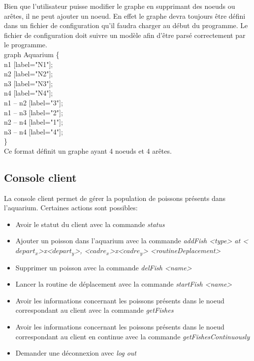 Bien que l'utilisateur puisse modifier le graphe en supprimant des noeuds ou arêtes, il ne peut ajouter un noeud. En effet le graphe devra toujours être défini dans un fichier de configuration qu'il faudra charger au début du programme.
Le fichier de configuration doit suivre un modèle afin d'être parsé correctement par le programme. \\

 \noindent graph Aquarium \{\\
    \indent n1 [label="N1"];\\
    \indent n2 [label="N2"];\\
    \indent n3 [label="N3"];\\
    \indent n4 [label="N4"];\\
    \indent n1 -- n2 [label="3"];\\
    \indent n1 -- n3 [label="2"];\\
    \indent n2 -- n4 [label="1"];\\
    \indent n3 -- n4 [label="4"];\\
\} \\
\label{the_label}
Ce format définit un graphe ayant 4 noeuds et 4 arêtes.

\subsection{Console client}
La console client permet de gérer la population de poissons présents dans l'aquarium. Certaines actions sont possibles:
\begin{itemize}
\item Avoir le statut du client avec la commande \textit{status}
\item Ajouter un poisson dans l'aquarium avec la commande \textit{addFish  <type> at <$depart_x$>x<$depart_y$>, <$cadre_x$>x<$cadre_y$>  <routineDeplacement>}

\item Supprimer un poisson avec la commande \textit{delFish <name>}
\item Lancer la routine de déplacement avec la commande \textit{startFish <name>}
\item Avoir les informations  concernant les poissons présents dans le noeud correspondant au client avec la commande  \textit{getFishes}
\item Avoir les informations  concernant les poissons présents dans le noeud correspondant au client en continue avec la commande \textit{getFishesContinuously}
\item Demander une déconnexion avec \textit{log out}
\end{itemize}

